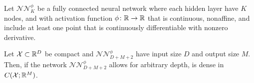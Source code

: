 \begin{definition}\label{def:neuralnet_kidger_def}
    Let \(\mathcal{NN}^{\phi}_{K}\) be a fully connected neural network where
    each hidden layer have \(K\) nodes, and with activation function \(\phi\colon \mathbb{R} \to \mathbb{R}\)
    that is continuous, nonaffine, and include at least one point that is continuously differentiable
    with nonzero derivative.
\end{definition}
\begin{theorem}\label{thm:uni_nn}
    Let \(\mathcal{X}\subset \mathbb{R}^D\) be compact and \(\mathcal{NN}_{D+M+2}^{\phi}\)
    have input size \(D\) and output size \(M\).
    Then, if the network \(\mathcal{NN}_{D+M+2}^{\phi}\) allows for 
    arbitrary depth, is dense in \(C(\mathcal{X}; \mathbb{R}^M)\).
\end{theorem}
